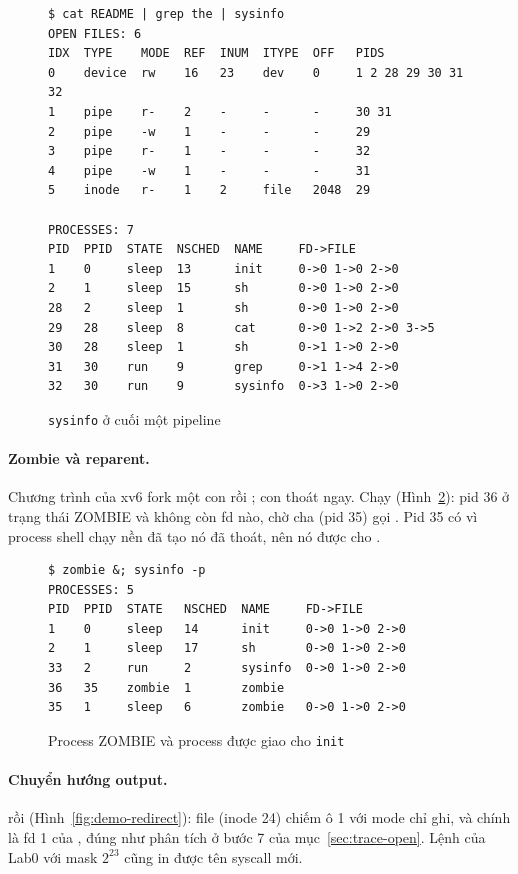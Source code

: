 \begin{figure}[H]
\begin{verbatim}
$ cat README | grep the | sysinfo
OPEN FILES: 6
IDX  TYPE    MODE  REF  INUM  ITYPE  OFF   PIDS
0    device  rw    16   23    dev    0     1 2 28 29 30 31 32
1    pipe    r-    2    -     -      -     30 31
2    pipe    -w    1    -     -      -     29
3    pipe    r-    1    -     -      -     32
4    pipe    -w    1    -     -      -     31
5    inode   r-    1    2     file   2048  29

PROCESSES: 7
PID  PPID  STATE  NSCHED  NAME     FD->FILE
1    0     sleep  13      init     0->0 1->0 2->0
2    1     sleep  15      sh       0->0 1->0 2->0
28   2     sleep  1       sh       0->0 1->0 2->0
29   28    sleep  8       cat      0->0 1->2 2->0 3->5
30   28    sleep  1       sh       0->1 1->0 2->0
31   30    run    9       grep     0->1 1->4 2->0
32   30    run    9       sysinfo  0->3 1->0 2->0
\end{verbatim}
\caption{\texttt{sysinfo} ở cuối một pipeline}
\label{fig:demo-pipe}
\end{figure}

\paragraph{Zombie và reparent.}
Chương trình  của xv6 fork một con rồi ; con thoát ngay.
Chạy  (Hình~\ref{fig:demo-zombie}): pid 36 ở trạng
thái ZOMBIE và không còn fd nào, chờ cha (pid 35) gọi . Pid 35 có
 vì process shell chạy nền đã tạo nó đã thoát, nên nó được
 cho .

\begin{figure}[H]
\begin{verbatim}
$ zombie &; sysinfo -p
PROCESSES: 5
PID  PPID  STATE   NSCHED  NAME     FD->FILE
1    0     sleep   14      init     0->0 1->0 2->0
2    1     sleep   17      sh       0->0 1->0 2->0
33   2     run     2       sysinfo  0->0 1->0 2->0
36   35    zombie  1       zombie
35   1     sleep   6       zombie   0->0 1->0 2->0
\end{verbatim}
\caption{Process ZOMBIE và process được giao cho \texttt{init}}
\label{fig:demo-zombie}
\end{figure}

\paragraph{Chuyển hướng output.}
 rồi  (Hình~\ref{fig:demo-redirect}): file
 (inode 24) chiếm ô 1 với mode chỉ ghi, và chính là fd 1 của
, đúng như phân tích ở bước 7 của mục~\ref{sec:trace-open}.
Lệnh  của Lab0 với mask $2^{23}$ cũng in được tên syscall mới.

